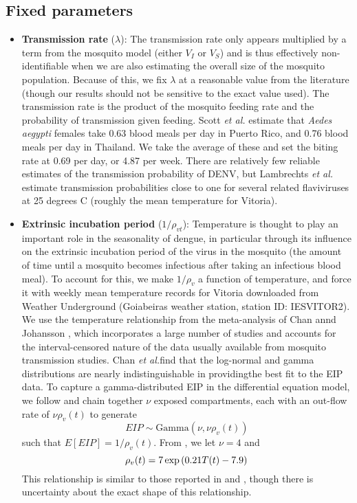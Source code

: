 \documentclass[12pt,letterpaper]{article}
\begin{document}
\subsection*{Fixed parameters}

\begin{itemize}
\item \textbf{Transmission rate} ($\lambda$): The transmission rate only appears multiplied by a term from the mosquito model (either $V_I$ or $V_S$) and is thus effectively non-identifiable when we are also estimating the overall size of the mosquito population.
Because of this, we fix $\lambda$ at a reasonable value from the literature (though our results should not be sensitive to the exact value used).
The transmission rate is the product of the mosquito feeding rate and the probability of transmission given feeding.
Scott \textit{et al.} \cite{Scott2000} estimate that \textit{Aedes aegypti} females take 0.63 blood meals per day in Puerto Rico, and 0.76 blood meals per day in Thailand.
We take the average of these and set the biting rate at 0.69 per day, or 4.87 per week.
There are relatively few reliable estimates of the transmission probability of DENV, but Lambrechts \textit{et al.} \cite{Lambrechts2011} estimate transmission probabilities close to one  for several related flaviviruses at 25 degrees C (roughly the mean temperature for Vitoria).
\\
\item \textbf{Extrinsic incubation period} ($1/\rho_{vt}$): Temperature is thought to play an important role in the seasonality of dengue, in particular through its influence on the extrinsic incubation period of the virus in the mosquito  (the amount of time until a mosquito becomes infectious after taking an infectious blood meal).
To account for this, we make $1/\rho_v$ a function of temperature, and force it with weekly mean temperature records for Vitoria downloaded from Weather Underground (Goiabeiras weather station, station ID: IESVITOR2).
We use the temperature relationship from the meta-analysis of Chan annd Johansson \cite{Chan2012}, which incorporates a large number of studies and accounts for the interval-censored nature of the data usually available from mosquito transmission studies.
Chan \textit{et al.}find that the log-normal and gamma distributions are nearly indistinguishable in providingthe best fit to the EIP data.
To capture a gamma-distributed EIP in the differential equation model, we follow \cite{Lloyd2001} and chain together $\nu$ exposed compartments, each with an out-flow rate of $\nu\rho_v(t)$ to generate
\begin{equation}
EIP \sim \text{Gamma}(\nu, \nu \rho_v(t))
\end{equation}
such that $E[EIP] = 1/ \rho_v(t)$.
From \cite{Chan2012}, we let $\nu = 4$ and 
\begin{equation}
\rho_v(t) = 7\exp \left(0.21T(t) - 7.9\right)\\
\end{equation}
This relationship is similar to those reported in \cite{Focks1995} and \cite{Tjaden2013}, though there is uncertainty about the exact shape of this relationship.
\end{itemize}
\end{document}
